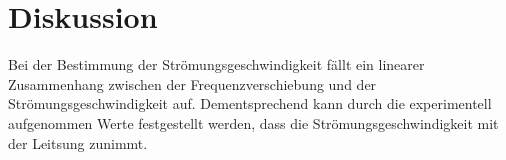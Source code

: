\section{Diskussion}
\label{sec:diskussion}

Bei der Bestimmung der Strömungsgeschwindigkeit fällt ein linearer Zusammenhang zwischen
der Frequenzverschiebung und der Strömungsgeschwindigkeit auf. Dementsprechend kann durch die experimentell 
aufgenommen Werte festgestellt werden, dass die Strömungsgeschwindigkeit mit der Leitsung zunimmt.

